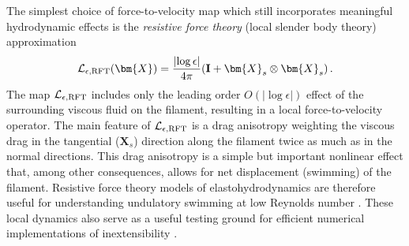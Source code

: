 \documentclass[11pt,reqno]{amsart}
\newcommand{\X}{\bm{X}}
\newcommand{\abs}[1]{\left\lvert #1 \right\rvert}
\newcommand{\mc}[1]{\mathcal{#1}}
\numberwithin{equation}{section}
\theoremstyle{definition}
\begin{document}
The simplest choice of force-to-velocity map which still incorporates meaningful hydrodynamic effects is the \emph{resistive force theory} (local slender body theory) \cite{gray1955propulsion, johnson1979flagellar, keller1976swimming, pironneau1974optimal} approximation
\begin{equation}\label{eq:LRFT}
  \mc{L}_{\epsilon,{\rm RFT}}(\X) = \frac{\abs{\log\epsilon}}{4\pi}({\bf I}+\X_s\otimes\X_s)\,.
\end{equation}
The map $\mc{L}_{\epsilon,{\rm RFT}}$ includes only the leading order $O(\abs{\log\epsilon})$ effect of the surrounding viscous fluid on the filament, resulting in a local force-to-velocity operator. The main feature of $\mc{L}_{\epsilon,{\rm RFT}}$ is a drag anisotropy weighting the viscous drag in the tangential ($\X_s$) direction along the filament twice as much as in the normal directions. This drag anisotropy is a simple but important nonlinear effect that, among other consequences, allows for net displacement (swimming) of the filament. Resistive force theory models of elastohydrodynamics are therefore useful for understanding undulatory swimming at low Reynolds number \cite{friedrich2010high, el2020optimal, gadelha2010nonlinear, gadelha2019flagellar, hu2022enhanced, montenegro2015spermatozoa, lauga2013shape, lauga2007floppy,  spagnolie2010optimal, lauga2009hydrodynamics, mori2023well,ohm2024well}. These local dynamics also serve as a useful testing ground for efficient numerical implementations of inextensibility \cite{moreau2018asymptotic,hall2019efficient,walker2020efficient}. 
\end{document}
